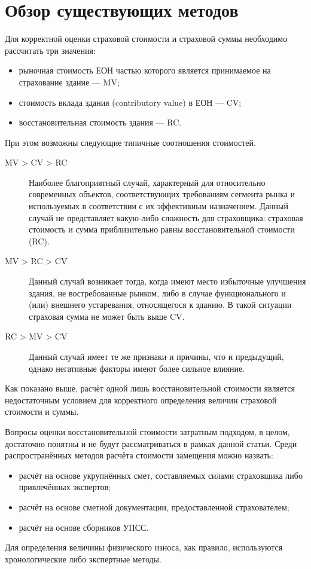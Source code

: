 \documentclass[12pt]{scrartcl}
\begin{document}
\section{Обзор существующих методов}\label{sec:LiteratureReview}
Для корректной оценки страховой стоимости и страховой суммы необходимо рассчитать три значения:
\begin{itemize}
    \item рыночная стоимость ЕОН частью которого является принимаемое на страхование здание --- MV;
    \item стоимость вклада здания (contributory value) в ЕОН --- CV;
    \item восстановительная стоимость здания --- RC.
\end{itemize}
При этом возможны следующие типичные соотношения стоимостей.
\begin{description}
    \item[MV > CV > RC] Наиболее благоприятный случай, характерный для относительно современных объектов, соответствующих требованиям сегмента рынка и используемых в соответствии с их эффективным назначением. Данный случай не представляет какую-либо сложность для страховщика: страховая стоимость и сумма приблизительно равны восстановительной стоимости (RC).
    \item[MV > RC > CV] Данный случай возникает тогда, когда имеют место избыточные улучшения здания, не востребованные рынком, либо в случае функционального и (или) внешнего устаревания, относящегося к зданию. В такой ситуации страховая сумма не может быть выше CV.
    \item[RC > MV > CV] Данный случай имеет те же признаки и причины, что и предыдущий, однако негативные факторы имеют более сильное влияние.
\end{description}
Как показано выше, расчёт одной лишь восстановительной стоимости является недостаточным условием для корректного определения величин страховой стоимости и суммы.

Вопросы оценки восстановительной стоимости затратным подходом, в целом, достаточно понятны и не будут рассматриваться в рамках данной статьи. Среди распространённых методов расчёта стоимости замещения можно назвать:
\begin{itemize}
    \item расчёт на основе укрупнённых смет, составляемых силами страховщика либо привлечённых экспертов;
    \item расчёт на основе сметной документации, предоставленной страхователем;
    \item расчёт на основе сборников УПСС.
\end{itemize}
Для определения величины физического износа, как правило, используются хронологические либо экспертные методы.
\end{document}
